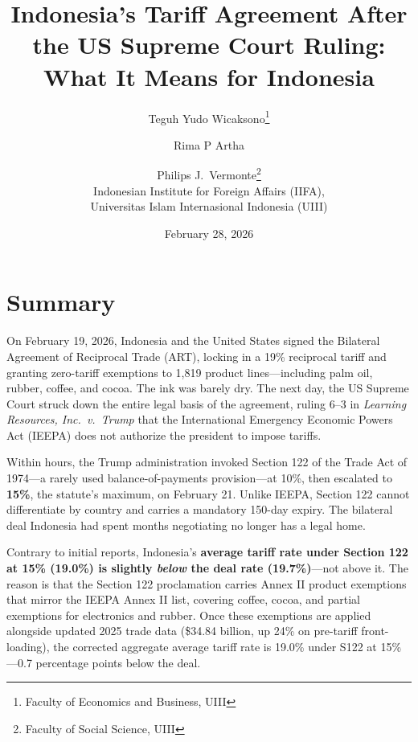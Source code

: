 \documentclass[12pt,a4paper]{article}
\begin{document}
\title{\textbf{Indonesia's Tariff Agreement After the US Supreme Court Ruling: What It Means for Indonesia}}


\author{Teguh Yudo Wicaksono\thanks{Faculty of Economics and Business, UIII} \and
        Rima P Artha \and
        Philips J.\ Vermonte\thanks{Faculty of Social Science, UIII} \\[0.5em]
        \small Indonesian Institute for Foreign Affairs (IIFA),\\
        \small Universitas Islam Internasional Indonesia (UIII)}


\date{February 28, 2026}
\onehalfspacing
\maketitle

\section*{Summary}

On February 19, 2026, Indonesia and the United States signed the Bilateral Agreement of Reciprocal Trade (ART), locking in a 19\% reciprocal tariff and granting zero-tariff exemptions to 1,819 product lines---including palm oil, rubber, coffee, and cocoa. The ink was barely dry. The next day, the US Supreme Court struck down the entire legal basis of the agreement, ruling 6--3 in \textit{Learning Resources, Inc.\ v.\ Trump} that the International Emergency Economic Powers Act (IEEPA) does not authorize the president to impose tariffs.

Within hours, the Trump administration invoked Section 122 of the Trade Act of 1974---a rarely used balance-of-payments provision---at 10\%, then escalated to \textbf{15\%}, the statute's maximum, on February 21. Unlike IEEPA, Section 122 cannot differentiate by country and carries a mandatory 150-day expiry. The bilateral deal Indonesia had spent months negotiating no longer has a legal home.

Contrary to initial reports, Indonesia's \textbf{average tariff rate under Section 122 at 15\% (19.0\%) is slightly \textit{below} the deal rate (19.7\%)}---not above it. The reason is that the Section 122 proclamation carries Annex II product exemptions that mirror the IEEPA Annex II list, covering coffee, cocoa, and partial exemptions for electronics and rubber. Once these exemptions are applied alongside updated 2025 trade data (\$34.84 billion, up 24\% on pre-tariff front-loading), the corrected aggregate average tariff rate is 19.0\% under S122 at 15\%---0.7 percentage points below the deal.
\end{document}
